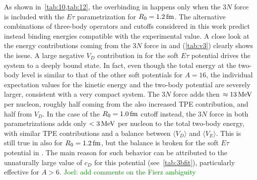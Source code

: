 \documentclass[aps,prc,twocolumn,superscriptaddress,floatfix]{revtex4-1}
\newcommand{\green}[1]{\protect\textcolor{green}{#1}}
\begin{document}
As shown in~\cref{tab:10,tab:12}, the overbinding in  happens only when the $3N$ force 
is included with the $E\tau$ parametrization for $R_0=1.2\,\rm fm$. The alternative combinations of three-body 
operators and cutoffs considered in this work predict instead binding energies compatible with the 
experimental value. A close look at the energy contributions coming from the $3N$ force in 
 and  (\cref{tab:v3}) clearly shows the issue. 
A large negative $V_D$ contribution in  for the soft $E\tau$ potential drives the system to 
a deeply bound state. In fact, even though the total energy at the two-body level is similar 
to that of the other soft potentials for $A=16$, the individual expectation values for the kinetic
energy and the two-body potential are severely larger, consistent with a very compact system. 
The $3N$ force adds then $\approx 13\,\rm MeV$ per nucleon, roughly half coming from the also
increased TPE contribution, and half from $V_D$. In the case of the $R_0=1.0\,\rm fm$ cutoff instead, 
the $3N$ force in both parametrizations adds only $<3\,\rm MeV$ per nucleon to the total
two-body energy, with similar TPE contributions and a balance between $\langle V_D\rangle$ and
$\langle V_E\rangle$. This is still true in  also for $R_0=1.2\,\rm fm$, but 
the balance is broken for the soft $E\tau$ potential in . The main reason for such
behavior can be attributed to the unnaturally large value of $c_D$ for this potential 
(see~\cref{tab:3bfit}), particularly effective for $A>6$. 
\green{Joel: add comments on the Fierz ambiguity}

\end{document}
